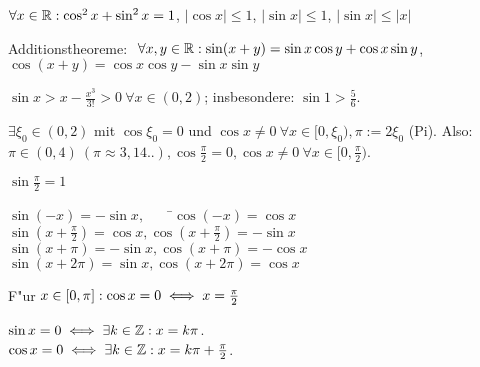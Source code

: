 \documentclass[a4paper,twoside,DIV15,BCOR12mm]{scrbook}
\begin{document}
\begin{satz}
\begin{liste}
\item $\forall x \in \mathbb{R}: \cos^2 x + \sin^2 x = 1$, $|\cos x| \le 1$, $|\sin x| \le 1$, $|\sin x| \le |x|$
\item Additionstheoreme: $\ \forall x,y \in \mathbb{R}: \sin(x+y) = \sin x \cos y + \cos x \sin y$, $\cos(x+y) = \cos x \cos y - \sin x \sin y$
\item $\sin x > x - \frac{x^3}{3!} > 0 \ \forall x \in (0, 2)$; insbesondere: $\sin 1 > \frac{5}{6}$.
\item $\exists \xi_0 \in (0, 2)$ mit $\cos \xi_0=0$ und $\cos x \ne 0\ \forall x \in [0, \xi_0), \pi:=2\xi_0$ (Pi). Also: $\pi \in (0, 4)\ (\pi \approx 3,14..), \cos\frac{\pi}{2}=0, \cos x \ne 0 \ \forall x \in [0, \frac{\pi}{2})$.
\item $\sin\frac{\pi}{2}=1$
\item \begin{tabbing}
$\sin(-x)=-\sin x, $\ \ \ \ \=$\cos(-x)=\cos x$\\
$\sin(x+\frac{\pi}{2})=\cos x, $\>$\cos(x+\frac{\pi}{2})=-\sin x$\\
$\sin(x+\pi)=-\sin x, $\>$\cos(x+\pi)=-\cos x$\\
$\sin(x+2\pi)=\sin x, $\>$\cos(x+2\pi)=\cos x$
\end{tabbing}
\item F"ur $x \in [0, \pi]: \cos x = 0 \iff x=\frac{\pi}{2}$
\item $\sin x=0 \iff \exists k \in \mathbb{Z}: x = k\pi$. \\
	$\cos x=0 \iff \exists k \in \mathbb{Z}: x = k\pi+\frac{\pi}{2}$.
\end{liste}
\end{satz}
\end{document}
